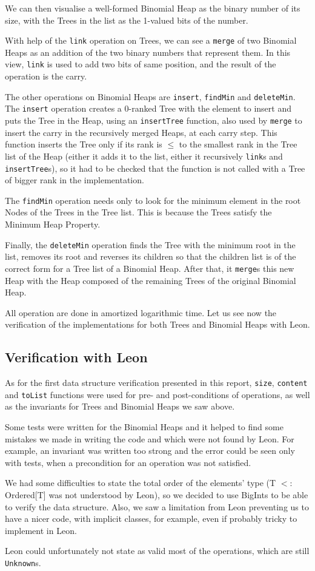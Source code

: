 We can then visualise a well-formed Binomial Heap as the binary number of its size, 
with the Trees in the list as the 1-valued bits of the number.

With help of the \verb|link| operation on Trees, 
we can see a \verb|merge| of two Binomial Heaps 
as an addition of the two binary numbers that represent them.
In this view, \verb|link| is used to add two bits of same position,
and the result of the operation is the carry.

The other operations on Binomial Heaps are \verb|insert|, \verb|findMin| and \verb|deleteMin|. 
The \verb|insert| operation creates a 0-ranked Tree with the element to insert 
and puts the Tree in the Heap, using an \verb|insertTree| function, 
also used by \verb|merge| to insert the carry in the recursively merged Heaps,
at each carry step.
This function inserts the Tree only if its rank is $\leq$ to the smallest rank in the Tree list of the Heap 
(either it adds it to the list, either it recursively \verb|link|s and \verb|insertTree|s),
so it had to be checked that the function is not called with a Tree of bigger rank in the implementation.

The \verb|findMin| operation needs only to look for the minimum element 
in the root Nodes of the Trees in the Tree list.
This is because the Trees satisfy the Minimum Heap Property.

Finally, the \verb|deleteMin| operation finds the Tree with the minimum root in the list,
removes its root 
and reverses its children so that the children list is of the correct form for a Tree list of a Binomial Heap.
After that, it \verb|merge|s this new Heap with the Heap composed of 
the remaining Trees of the original Binomial Heap.

All operation are done in amortized logarithmic time.
Let us see now the verification of the implementations 
for both Trees and Binomial Heaps with Leon.

\subsection{Verification with Leon}
As for the first data structure verification presented in this report,
 \verb|size|, \verb|content| and \verb|toList| functions were used
 for pre- and post-conditions of operations,
as well as the invariants for Trees and Binomial Heaps we saw above.

Some tests were written for the Binomial Heaps and 
it helped to find some mistakes we made in writing the code and 
which were not found by Leon.
For example, an invariant was written too strong and 
the error could be seen only with tests,
when a precondition for an operation was not satisfied.

We had some difficulties to state the total order of the elements' type
(T $<:$ Ordered[T] was not understood by Leon), 
so we decided to use BigInts to be able to verify the data structure.
Also, we saw a limitation from Leon preventing us to have a nicer code, 
with implicit classes, for example, even if probably tricky to implement in Leon.

Leon could unfortunately not state as valid most of the operations, 
which are still \verb|Unknown|s.

